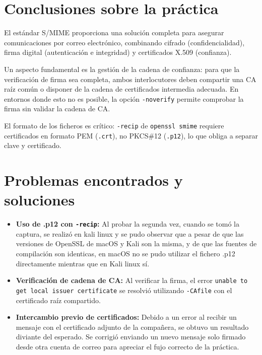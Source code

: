 \documentclass[12pt,a4paper]{report}
\begin{document}
\section{Conclusiones sobre la práctica}

El estándar S/MIME proporciona una solución completa para asegurar comunicaciones por correo electrónico, combinando cifrado (confidencialidad), firma digital (autenticación e integridad) y certificados X.509 (confianza).

Un aspecto fundamental es la gestión de la cadena de confianza: para que la verificación de firma sea completa, ambos interlocutores deben compartir una CA raíz común o disponer de la cadena de certificados intermedia adecuada. En entornos donde esto no es posible, la opción \texttt{-noverify} permite comprobar la firma sin validar la cadena de CA.

El formato de los ficheros es crítico: \texttt{-recip} de \texttt{openssl smime} requiere certificados en formato PEM (\texttt{.crt}), no PKCS\#12 (\texttt{.p12}), lo que obliga a separar clave y certificado.

\section{Problemas encontrados y soluciones}

\begin{itemize}[label=\textbullet]
    \item \textbf{Uso de .p12 con \texttt{-recip}:} Al probar la segunda vez, cuando se tomó la captura, se realizó en
     kali linux y se pudo observar que a pesar de que las versiones de OpenSSL de macOS y Kali son la misma, y de que las fuentes de compilación
    son identicas, en macOS no se pudo utilizar el fichero .p12 directamente mientras que en Kali linux sí.
    \item \textbf{Verificación de cadena de CA:} Al verificar la firma, el error \texttt{unable to get local issuer certificate} se resolvió utilizando \texttt{-CAfile} con el certificado raíz compartido.
    \item \textbf{Intercambio previo de certificados:} Debido a un error al recibir un mensaje con el certificado adjunto de la compañera, se obtuvo un resultado diviante del esperado. Se corrigió
    enviando un nuevo mensaje solo firmado desde otra cuenta de correo para apreciar el fujo correcto de la práctica.
\end{itemize}

\end{document}
